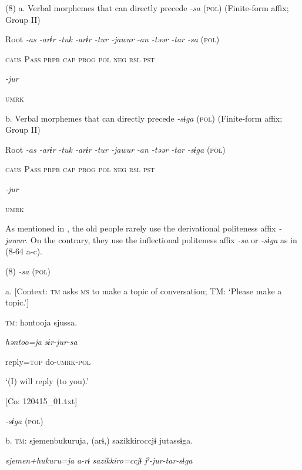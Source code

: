 (8)  a. Verbal morphemes that can directly precede \textit{{}-sa} (\textsc{pol}) (Finite-form affix; Group II)

  Root  \textit{{}-as  {}-arɨr} %
\textit{{}-tuk  {}-arɨr  {}-tur  {}-jawur} %
\textit{{}-an  {}-təər  {}-tar  {}-sa} (\textsc{pol})

    \textsc{caus}  P\textsc{ass}  \textsc{prpr}  \textsc{cap}  \textsc{prog}  \textsc{pol}  \textsc{neg}  \textsc{rsl}  \textsc{pst}

          \textit{{}-jur} 

          \textsc{umrk}

  b. Verbal morphemes that can directly precede \textit{{}-sɨga} (\textsc{pol}) (Finite-form affix; Group II)

  Root  \textit{{}-as  {}-arɨr} %
\textit{{}-tuk  {}-arɨr  {}-tur  {}-jawur} %
\textit{{}-an  {}-təər  {}-tar  {}-sɨga} (\textsc{pol})

    \textsc{caus}  P\textsc{ass}  \textsc{prpr}  \textsc{cap}  \textsc{prog}  \textsc{pol}  \textsc{neg}  \textsc{rsl}  \textsc{pst}

          \textit{{}-jur} 

          \textsc{umrk}

As mentioned in , the old people rarely use the derivational politeness affix \textit{{}-jawur}. On the contrary, they use the inflectional politeness affix \textit{{}-sa} or \textit{{}-sɨga} as in (8-64 a-c).

(8)  \textit{{}-sa} (\textsc{pol})

  a.  [Context: \textsc{tm} asks \textsc{ms} to make a topic of conversation; TM: ‘Please make a topic.’]

    \textsc{tm}:  həntooja  sjussa.

      \textit{həntoo=ja}  \textit{sɨr-jur-sa}

      reply=\textsc{top}  do-\textsc{umrk}-\textsc{pol}

      ‘(I) will reply (to you).’

      [Co: 120415\_01.txt]

  \textit{{}-sɨga} (\textsc{pol})

  b.  \textsc{tm}:  sjemenbukuruja,  (arɨ,)  sazikkiroccjɨ  jutassɨga.

      \textit{sjemen+hukuru=ja}  \textit{a-rɨ}  \textit{sazikkiro=ccjɨ}  \textit{jˀ-jur-tar-sɨga}

